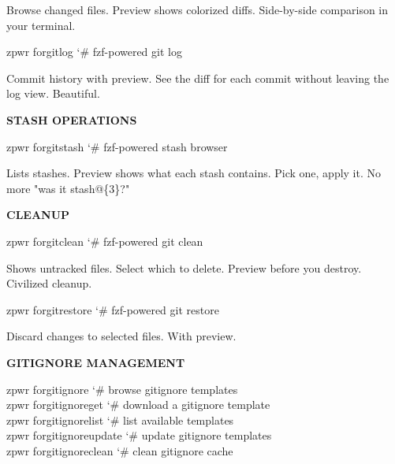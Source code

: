 \documentclass[11pt,a4paper,twoside]{book}
\begin{document}
Browse changed files. Preview shows colorized diffs. Side-by-side comparison in your terminal.

\begin{codebox}
\color{neongreen}zpwr forgitlog            {\char`\#} fzf-powered git log\\
\end{codebox}

Commit history with preview. See the diff for each commit without leaving the log view. Beautiful.


\vspace{12pt}
{\bfseries\color{neonyellow} STASH OPERATIONS}\vspace{4pt}

\begin{codebox}
\color{neongreen}zpwr forgitstash          {\char`\#} fzf-powered stash browser\\
\end{codebox}

Lists stashes. Preview shows what each stash contains. Pick one, apply it. No more "was it stash@\{3\}?"


\vspace{12pt}
{\bfseries\color{neonyellow} CLEANUP}\vspace{4pt}

\begin{codebox}
\color{neongreen}zpwr forgitclean          {\char`\#} fzf-powered git clean\\
\end{codebox}

Shows untracked files. Select which to delete. Preview before you destroy. Civilized cleanup.

\begin{codebox}
\color{neongreen}zpwr forgitrestore        {\char`\#} fzf-powered git restore\\
\end{codebox}

Discard changes to selected files. With preview.


\vspace{12pt}
{\bfseries\color{neonyellow} GITIGNORE MANAGEMENT}\vspace{4pt}

\begin{codebox}
\color{neongreen}zpwr forgitignore         {\char`\#} browse gitignore templates\\
\color{neongreen}zpwr forgitignoreget      {\char`\#} download a gitignore template\\
\color{neongreen}zpwr forgitignorelist     {\char`\#} list available templates\\
\color{neongreen}zpwr forgitignoreupdate   {\char`\#} update gitignore templates\\
\color{neongreen}zpwr forgitignoreclean    {\char`\#} clean gitignore cache\\
\end{codebox}
\end{document}
